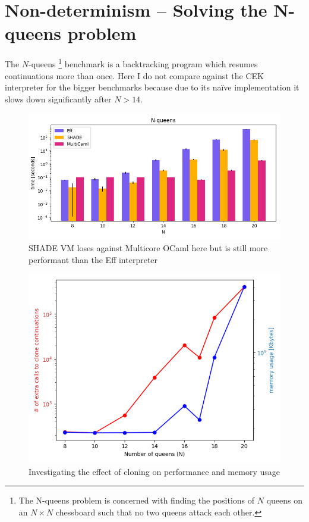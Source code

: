 \documentclass[class=article, crop=false]{standalone}
\begin{document}
\section{Non-determinism -- Solving the N-queens problem}

The $N$-queens
\footnote{The N-queens problem is concerned with finding the positions of $N$
queens on an $N \times N$ chessboard such that no two queens attack each other.}
benchmark is a backtracking program which resumes continuations more than once.
Here I do not compare against the CEK interpreter for the bigger benchmarks
because due to its naïve implementation it slows down significantly after
$N > 14$. 

\begin{figure}
    \centering
    \includegraphics[width=.9\linewidth]{eval_plots/comp_queens.png}
    \caption[N-queens benchmark]{SHADE VM loses against Multicore OCaml here but is still more
    performant than the Eff interpreter}
    \label{fig:n-queens}
\end{figure}

\begin{figure}
    \centering
    \includegraphics[width=.8\linewidth]{eval_plots/extra_cloning.png}
    \caption[Correlation between extra cloning and memory usage]{Investigating the effect of cloning on performance and memory usage}
    \label{fig:extra-copying}
\end{figure}
\end{document}
